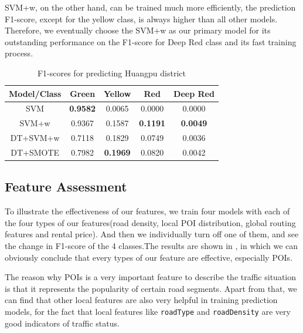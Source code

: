 SVM+w, on the other hand, can be trained much more efficiently, the prediction
F1-score, except for the yellow class, is always higher than all other models. 
Therefore, we eventually choose the SVM+w as our primary model 
for its outstanding performance on the F1-score for Deep Red class and 
its fast training process. 

\begin{table}[ht]
\centering
\caption{F1-scores for predicting Huangpu district}
\label{tab:modelselect}
\begin{tabular}{|c|c|c|c|c|} \hline
Model/Class & Green & Yellow & Red & Deep Red \\ \hline\hline
SVM & {\bf 0.9582} & 0.0065& 0.0000 & 0.0000 \\ \hline
SVM+w & 0.9367 & 0.1587  & {\bf 0.1191}  & {\bf 0.0049} \\ \hline 
DT+SVM+w & 0.7118  & 0.1829 & 0.0749 & 0.0036\\ \hline 
DT+SMOTE & 0.7982 & {\bf 0.1969} & 0.0820 & 0.0042\\ \hline 
\end{tabular}
\end{table}

\subsection{Feature Assessment}
To illustrate the effectiveness of our features, we train four models with each of the four types of our features(road density, local POI distribution, global routing features and rental price). And then we  individually turn off one of them, and see the change in F1-score of the 4 classes.The results are shown in , in which we can obviously conclude that every types of our feature are effective, especially POIs. 


The reason why POIs is a very important feature to describe the traffic situation is that it represents the popularity of certain road segments. Apart from that, we can find that other local features are also very helpful in training prediction models, for the fact that local features like \texttt{roadType} and \texttt{roadDensity} are very good indicators of traffic status.


